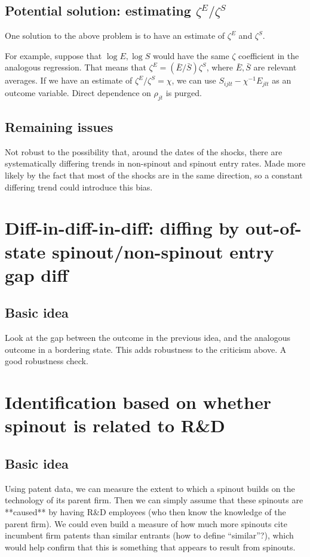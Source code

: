\documentclass[11pt,english]{article}
\theoremstyle{remark}
\begin{document}
\subsection{Potential solution: estimating $\zeta^E / \zeta^S$}

One solution to the above problem is to have an estimate of $\zeta^E$ and $\zeta^S$. 

For example, suppose that $\log E, \log S$ would have the same $\zeta$ coefficient in the analogous regression. That means that $\zeta^E = (\bar{E}/\bar{S}) \zeta^S$, where $\bar{E},\bar{S}$ are relevant averages. If we have an estimate of $\zeta^E / \zeta^S = \chi$, we can use $S_{ijlt} - \chi^{-1} E_{jlt}$ as an outcome variable. Direct dependence on $\rho_{jt}$ is purged. 



\subsection{Remaining issues}
Not robust to the possibility that, around the dates of the shocks, there are systematically differing trends in non-spinout and spinout entry rates. Made more likely by the fact that most of the shocks are in the same direction, so a constant differing trend could introduce this bias.


\section{Diff-in-diff-in-diff: diffing by out-of-state spinout/non-spinout entry gap diff}

\subsection{Basic idea}
Look at the gap between the outcome in the previous idea, and the analogous outcome in a bordering state. This adds robustness to the criticism above. A good robustness check. 


\section{Identification based on whether spinout is related to R\&D}

\subsection{Basic idea}
Using patent data, we can measure the extent to which a spinout builds on the technology of its parent firm. Then we can simply assume that these spinouts are **caused** by having R\&D employees (who then know the knowledge of the parent firm). We could even build a measure of how much more spinouts cite incumbent firm patents than similar entrants (how to define ``similar''?), which would help confirm that this is something that appears to result from spinouts. 
\end{document}
